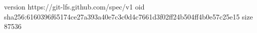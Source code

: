 version https://git-lfs.github.com/spec/v1
oid sha256:6160396f65174ce27a393a40e7c3c0d4c7661d3f02ff24b504ff4b0e57c25e15
size 87536
